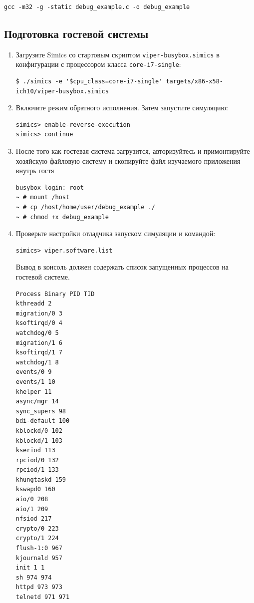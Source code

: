 \begin{lstlisting}
gcc -m32 -g -static debug_example.c -o debug_example
\end{lstlisting} 

\subsection{Подготовка гостевой системы}

\begin{enumerate}

\item Загрузите Simics со стартовым скриптом \texttt{viper-busybox.simics} в конфигурации с процессором класса \texttt{core-i7-single}:

\begin{lstlisting}
$ ./simics -e '$cpu_class=core-i7-single' targets/x86-x58-ich10/viper-busybox.simics
\end{lstlisting}

\item Включите режим обратного исполнения. Затем запустите симуляцию:
\begin{lstlisting}
simics> enable-reverse-execution
simics> continue
\end{lstlisting}

\item После того как гостевая система загрузится, авторизуйтесь и примонтируйте хозяйскую файловую систему и скопируйте файл изучаемого приложения внутрь гостя
\begin{lstlisting}
busybox login: root
~ # mount /host
~ # cp /host/home/user/debug_example ./
~ # chmod +x debug_example
\end{lstlisting}

\item Проверьте настройки отладчика запуском симуляции и командой:
\begin{lstlisting}
simics> viper.software.list
\end{lstlisting}

Вывод в консоль должен содержать список запущенных процессов на гостевой системе.
\begin{lstlisting}
Process Binary PID TID
kthreadd 2
migration/0 3
ksoftirqd/0 4
watchdog/0 5
migration/1 6
ksoftirqd/1 7
watchdog/1 8
events/0 9
events/1 10
khelper 11
async/mgr 14
sync_supers 98
bdi-default 100
kblockd/0 102
kblockd/1 103
kseriod 113
rpciod/0 132
rpciod/1 133
khungtaskd 159
kswapd0 160
aio/0 208
aio/1 209
nfsiod 217
crypto/0 223
crypto/1 224
flush-1:0 967
kjournald 957
init 1 1
sh 974 974
httpd 973 973
telnetd 971 971
\end{lstlisting}


\end{enumerate}
